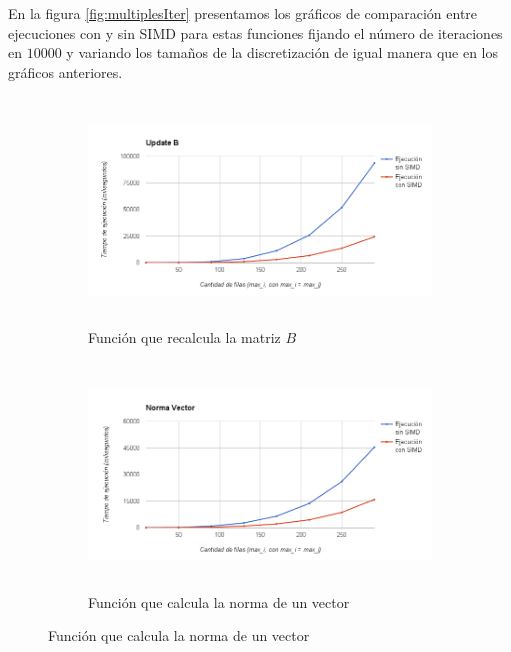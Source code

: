 \documentclass[a4paper]{article}
\begin{document}
En la figura \ref{fig:multiplesIter} presentamos 
los gráficos de comparación entre ejecuciones con y sin SIMD para 
estas funciones fijando el número de iteraciones en $10000$ y variando 
los tamaños de la discretización de igual manera que en los gráficos 
anteriores.

\begin{figure}[!htbp]
\centering
\begin{subfigure}{.5\textwidth}
  \centering
	\hspace{-1.5cm}\includegraphics[height=6cm, width=\linewidth]{images/UpdateB.png}
  \caption{Función que recalcula la matriz $B$}
	\label{fig:UpdateB}
\end{subfigure}%
\begin{subfigure}{.5\textwidth}
  \centering
	\includegraphics[height=6cm, width=\linewidth]{images/NormVector.png}
  \caption{Función que calcula la norma de un vector}
  \label{fig:NormVector}
\end{subfigure}


\end{figure}
\end{document}
